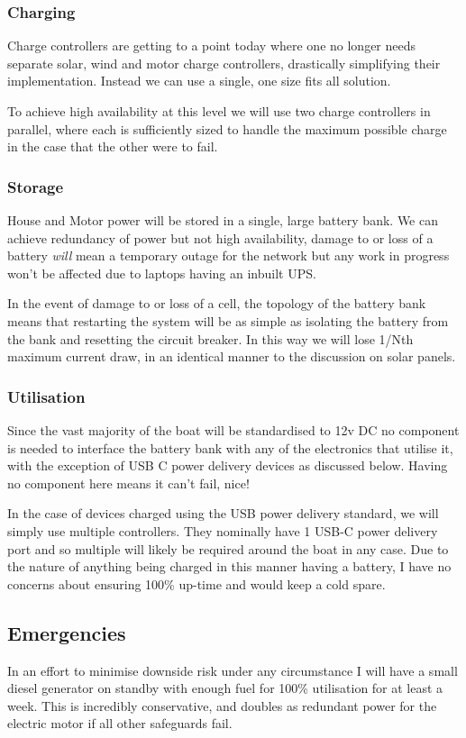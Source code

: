 \subsubsection{Charging}
Charge controllers are getting to a point today where one no longer needs separate solar, wind and motor charge controllers, drastically simplifying their implementation. Instead we can use a single, one size fits all solution. 

To achieve high availability at this level we will use two charge controllers in parallel, where each is sufficiently sized to handle the maximum possible charge in the case that the other were to fail.

\subsubsection{Storage}
House and Motor power will be stored in a single, large battery bank. We can achieve redundancy of power but not high availability, damage to or loss of a battery \textit{will} mean a temporary outage for the network but any work in progress won't be affected due to laptops having an inbuilt UPS.

In the event of damage to or loss of a cell, the topology of the battery bank means that restarting the system will be as simple as isolating the battery from the bank and resetting the circuit breaker. In this way we will lose 1/Nth maximum current draw, in an identical manner to the discussion on solar panels.

\subsubsection{Utilisation}

Since the vast majority of the boat will be standardised to 12v DC no component is needed to interface the battery bank with any of the electronics that utilise it, with the exception of USB C power delivery devices as discussed below. Having no component here means it can't fail, nice!

In the case of devices charged using the USB power delivery standard, we will simply use multiple controllers. They nominally have 1 USB-C power delivery port and so multiple will likely be required around the boat in any case. Due to the nature of anything being charged in this manner having a battery, I have no concerns about ensuring 100\% up-time and would keep a cold spare. 

\subsection{Emergencies}
In an effort to minimise downside risk under any circumstance I will have a small diesel generator on standby with enough fuel for 100\% utilisation for at least a week. This is incredibly conservative, and doubles as redundant power for the electric motor if all other safeguards fail.

